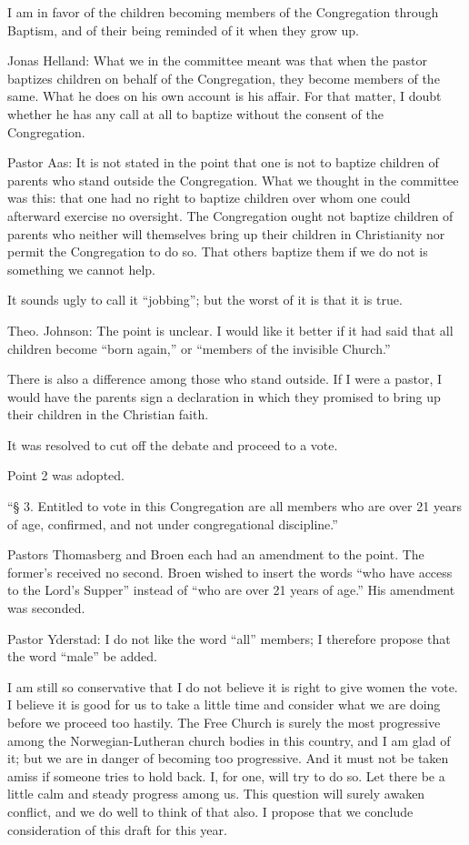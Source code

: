 I am in favor of the children becoming members of the Congregation through Baptism, and of their being reminded of it when they grow up.

Jonas Helland: What we in the committee meant was that when the pastor baptizes children on behalf of the Congregation, they become members of the same. What he does on his own account is his affair. For that matter, I doubt whether he has any call at all to baptize without the consent of the Congregation.

Pastor Aas: It is not stated in the point that one is not to baptize children of parents who stand outside the Congregation. What we thought in the committee was this: that one had no right to baptize children over whom one could afterward exercise no oversight. The Congregation ought not baptize children of parents who neither will themselves bring up their children in Christianity nor permit the Congregation to do so. That others baptize them if we do not is something we cannot help.

It sounds ugly to call it “jobbing”; but the worst of it is that it is true.

Theo. Johnson: The point is unclear. I would like it better if it had said that all children become “born again,” or “members of the invisible Church.”

There is also a difference among those who stand outside. If I were a pastor, I would have the parents sign a declaration in which they promised to bring up their children in the Christian faith.

It was resolved to cut off the debate and proceed to a vote.

Point 2 was adopted.

“§ 3. Entitled to vote in this Congregation are all members who are over 21 years of age, confirmed, and not under congregational discipline.”

Pastors Thomasberg and Broen each had an amendment to the point. The former’s received no second. Broen wished to insert the words “who have access to the Lord’s Supper” instead of “who are over 21 years of age.” His amendment was seconded.

Pastor Yderstad: I do not like the word “all” members; I therefore propose that the word “male” be added.

I am still so conservative that I do not believe it is right to give women the vote. I believe it is good for us to take a little time and consider what we are doing before we proceed too hastily. The Free Church is surely the most progressive among the Norwegian-Lutheran church bodies in this country, and I am glad of it; but we are in danger of becoming too progressive. And it must not be taken amiss if someone tries to hold back. I, for one, will try to do so. Let there be a little calm and steady progress among us. This question will surely awaken conflict, and we do well to think of that also. I propose that we conclude consideration of this draft for this year.

